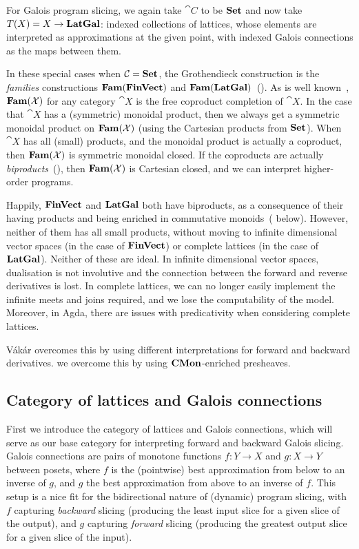 For Galois program slicing, we again take $\cat{C}$ to be $\mathbf{Set}$ and now take $T(X) = X \to \mathbf{LatGal}$: indexed collections of lattices, whose elements are interpreted as approximations at the given point, with indexed Galois connections as the maps between them.

In these special cases when $\mathcal{C} = \mathbf{Set}$, the Grothendieck construction is the {\em families} constructions $\mathbf{Fam}(\mathbf{FinVect})$ and $\mathbf{Fam}(\mathbf{LatGal})$~(). As is well known~\cite{lawvere63}, $\mathbf{Fam}(\mathcal{X})$ for any category $\cat{X}$ is the free coproduct completion of $\cat{X}$. In the case that $\cat{X}$ has a (symmetric) monoidal product, then we always get a symmetric monoidal product on $\mathbf{Fam}(\mathcal{X})$ (using the Cartesian products from $\mathbf{Set}$). When $\cat{X}$ has all (small) products, and the monoidal product is actually a coproduct, then $\mathbf{Fam}(\mathcal{X})$ is symmetric monoidal closed. If the coproducts are actually {\em biproducts}~(), then $\mathbf{Fam}(\mathcal{X})$ is Cartesian closed, and we can interpret higher-order programs.

Happily, $\mathbf{FinVect}$ and $\mathbf{LatGal}$ both have biproducts, as a consequence of their having products and being enriched in commutative monoids~( below). However, neither of them has all small products, without moving to infinite dimensional vector spaces (in the case of $\mathbf{FinVect}$) or complete lattices (in the case of $\mathbf{LatGal}$). Neither of these are ideal. In infinite dimensional vector spaces, dualisation is not involutive and the connection between the forward and reverse derivatives is lost. In complete lattices, we can no longer easily implement the infinite meets and joins required, and we lose the computability of the model. Moreover, in Agda, there are issues with predicativity when considering complete lattices.

Vákár overcomes this by using different interpretations for forward and backward derivatives. we overcome this by using $\mathbf{CMon}$-enriched presheaves.

\subsection{Category of lattices and Galois connections}

First we introduce the category of lattices and Galois connections, which will serve as our base category for
interpreting forward and backward Galois slicing. Galois connections are pairs of monotone functions $f: Y \to
X$ and $g: X \to Y$ between posets, where $f$ is the (pointwise) best approximation from below to an inverse
of $g$, and $g$ the best approximation from above to an inverse of $f$. This setup is a nice fit for the
bidirectional nature of (dynamic) program slicing, with $f$ capturing \emph{backward} slicing (producing the
least input slice for a given slice of the output), and $g$ capturing \emph{forward} slicing (producing the
greatest output slice for a given slice of the input).

